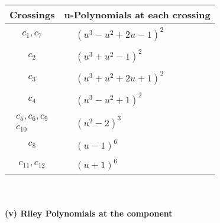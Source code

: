 \documentclass[1p]{elsarticle_modified}
\theoremstyle{definition}
\begin{document}
\begin{tabular}{m{50pt}|m{274pt}}
Crossings & \hspace{64pt}u-Polynomials at each crossing \\
\hline $$\begin{aligned}c_{1},c_{7}\end{aligned}$$&$\begin{aligned}
&(u^3- u^2+2 u-1)^2
\end{aligned}$\\
\hline $$\begin{aligned}c_{2}\end{aligned}$$&$\begin{aligned}
&(u^3+u^2-1)^2
\end{aligned}$\\
\hline $$\begin{aligned}c_{3}\end{aligned}$$&$\begin{aligned}
&(u^3+u^2+2 u+1)^2
\end{aligned}$\\
\hline $$\begin{aligned}c_{4}\end{aligned}$$&$\begin{aligned}
&(u^3- u^2+1)^2
\end{aligned}$\\
\hline $$\begin{aligned}c_{5},c_{6},c_{9}\\c_{10}\end{aligned}$$&$\begin{aligned}
&(u^2-2)^3
\end{aligned}$\\
\hline $$\begin{aligned}c_{8}\end{aligned}$$&$\begin{aligned}
&(u-1)^6
\end{aligned}$\\
\hline $$\begin{aligned}c_{11},c_{12}\end{aligned}$$&$\begin{aligned}
&(u+1)^6
\end{aligned}$\\
\hline
\end{tabular}\\~\\
\newpage\renewcommand{\arraystretch}{1}
\flushleft \textbf{(v) Riley Polynomials at the component}\newline \\
\end{document}
